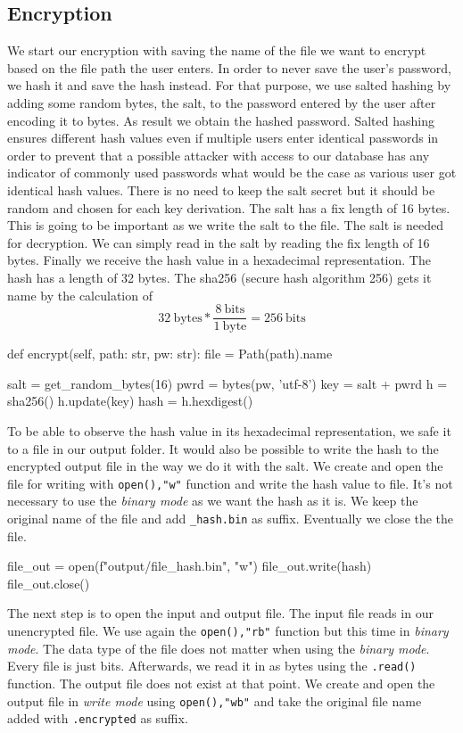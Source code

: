 \documentclass[]{article}
\begin{document}
\subsection{Encryption}
We start our encryption with saving the name of the file we want to encrypt based on the file path the user enters. 
In order to never save the user's password, we hash it and save the hash instead. For that purpose, we use salted hashing 
by adding some random bytes, the salt, to the password entered by the user after encoding it to bytes. As result we obtain 
the hashed password. Salted hashing ensures different hash values even if multiple users enter identical passwords in order 
to prevent that a possible attacker with access to our database has any indicator of commonly used passwords what would be 
the case as various user got identical hash values. There is no need to keep the salt secret but it should be random and chosen 
for each key derivation. The salt has a fix length of 16 bytes. This is going to be important 
as we write the salt to the file. The salt is needed for decryption. We can simply read in the salt by reading the fix 
length of 16 bytes. Finally we receive the hash value in a hexadecimal representation. The hash has a length of 32 bytes. 
The sha256 (secure hash algorithm 256) gets it name by the calculation of
$$32\ \text{bytes} * \frac{8\ \text{bits}}{1\ \text{byte}} = 256\ \text{bits}$$

\begin{python}
def encrypt(self, path: str, pw: str):
    file = Path(path).name

    salt = get_random_bytes(16) 
    pwrd = bytes(pw, 'utf-8')
    key = salt + pwrd
    h = sha256() 
    h.update(key) 
    hash = h.hexdigest()
\end{python}
\noindent
To be able to observe the hash value in its hexadecimal representation, we safe it to a file in our output folder. 
It would also be possible to write the hash to the encrypted output file in the way we do it with the salt. We create and open 
the file for writing with \texttt{open(),"w"} function and write the hash value to file. It's not necessary to
use the \textit{binary mode} as we want the hash as it is. We keep the original name of the file and add 
\texttt{\_hash.bin} as suffix. Eventually we close the the file.

\begin{python}
file_out = open(f"output/{file}_hash.bin", "w")
file_out.write(hash)
file_out.close()
\end{python}
\noindent
The next step is to open the input and output file. The input file reads in our unencrypted file. We use again
the \texttt{open(),"rb"} function but this time in \textit{binary mode}. The data type of the file
does not matter when using the \textit{binary mode}. Every file is just bits. Afterwards, we read it in as bytes 
using the \texttt{.read()} function. The output file does not exist at that point. We create and open the output file
in \textit{write mode} using \texttt{open(),"wb"} and take the original file name added with \texttt{.encrypted} as suffix.
\end{document}
